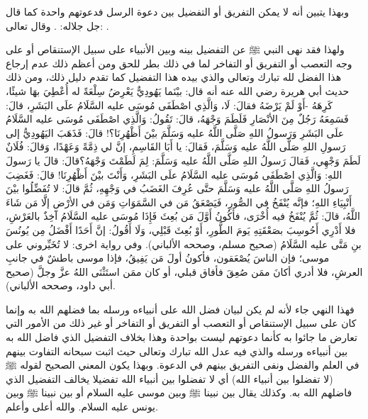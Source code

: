 وبهذا يتبين أنه لا يمكن التفريق أو التفضيل بين دعوة الرسل فدعوتهم واحدة كما قال جل جلاله: \quranayah*[2][136]{\footnotesize \surahname*[2]}. وقال تعالى:
\quranayah*[2][285]{\footnotesize \surahname*[2]}.

ولهذا فقد نهى النبي ﷺ عن التفضيل بينه وبين الأنبياء على سبيل الإستنقاص أو على وجه التعصب أو التفريق أو التفاخر لما في ذلك بطر للحق ومن أعظم ذلك عدم إرجاع هذا الفضل لله تبارك وتعالى والذي بيده هذا التفضيل كما تقدم دليل ذلك، ومن ذلك حديث أبي هريرة رضي الله عنه أنه قال: بيْنَما يَهُودِيٌّ يَعْرِضُ سِلْعَةً له أُعْطِيَ بهَا شيئًا، كَرِهَهُ -أَوْ لَمْ يَرْضَهُ فقالَ: لَا، وَالَّذِي اصْطَفَى مُوسَى عليه السَّلَامُ علَى البَشَرِ، قالَ: فَسَمِعَهُ رَجُلٌ مِنَ الأنْصَارِ فَلَطَمَ وَجْهَهُ، قالَ: تَقُولُ: وَالَّذِي اصْطَفَى مُوسَى عليه السَّلَامُ علَى البَشَرِ وَرَسولُ اللهِ صَلَّى اللَّهُ عليه وَسَلَّمَ بيْنَ أَظْهُرِنَا؟! قالَ: فَذَهَبَ اليَهُودِيُّ إلى رَسولِ اللهِ صَلَّى اللَّهُ عليه وَسَلَّمَ، فَقالَ: يا أَبَا القَاسِمِ، إنَّ لي ذِمَّةً وَعَهْدًا، وَقالَ: فُلَانٌ لَطَمَ وَجْهِي، فَقالَ رَسولُ اللهِ صَلَّى اللَّهُ عليه وَسَلَّمَ: لِمَ لَطَمْتَ وَجْهَهُ؟قالَ: قالَ يا رَسولَ اللهِ: وَالَّذِي اصْطَفَى مُوسَى عليه السَّلَامُ علَى البَشَرِ، وَأَنْتَ بيْنَ أَظْهُرِنَا! قالَ: فَغَضِبَ رَسولُ اللهِ صَلَّى اللَّهُ عليه وَسَلَّمَ حتَّى عُرِفَ الغَضَبُ في وَجْهِهِ، ثُمَّ قالَ: لا تُفَضِّلُوا بيْنَ أَنْبِيَاءِ اللهِ؛ فإنَّه يُنْفَخُ في الصُّورِ، فَيَصْعَقُ مَن في السَّمَوَاتِ وَمَن في الأرْضِ إلَّا مَن شَاءَ اللَّهُ، قالَ: ثُمَّ يُنْفَخُ فيه أُخْرَى، فأكُونُ أَوَّلَ مَن بُعِثَ فَإِذَا مُوسَى عليه السَّلَامُ آخِذٌ بالعَرْشِ، فلا أَدْرِي أَحُوسِبَ بصَعْقَتِهِ يَومَ الطُّورِ، أَوْ بُعِثَ قَبْلِي، وَلَا أَقُولُ: إنَّ أَحَدًا أَفْضَلُ مِن يُونُسَ بنِ مَتَّى عليه السَّلَامُ {\footnotesize (صحيح مسلم، وصححه الألباني)}. وفي رواية اخرى: لا تُخَيِّروني على موسى؛ فإن الناسَ يُصْعَقون، فأكونُ أولَ مَن يَفِيقُ، فإذا موسى باطشٌ في جانبِ العرشِ، فلا أدري أكانَ ممَن صُعِقَ فأفاق قبلي، أو كان ممَن استَثْنَى اللهُ عزَّ وجلَّ {\footnotesize (صحيح أبي داود، وصححه الألباني)}. 

فهذا النهي جاء لأنه لم يكن لبيان فضل الله على أنبياءه ورسله بما فضلهم الله به وإنما كان على سبيل الإستنقاص أو التعصب أو التفريق أو التفاخر أو غير ذلك من الأمور التي تعارض ما جائوا به كأنما دعوتهم ليست بواحدة وهذا بخلاف التفضيل الذي فاضل الله به بين أنبياءه ورسله والذي فيه عدل الله تبارك وتعالى حيث اثبت سبحانه التفاوت بينهم في العلم والفضل ونفى التفريق بينهم في الدعوة. وبهذا يكون المعني الصحيح لقوله ﷺ (لا تفضلوا بين أنبياء الله) أي لا تفضلوا بين أنبياء الله تفضيلا يخالف التفضيل الذي فاضلهم الله به. وكذلك يقال بين نبينا ﷺ وبين موسى عليه السلام أو بين نبينا ﷺ وبين يونس عليه السلام. والله أعلى وأعلم.

